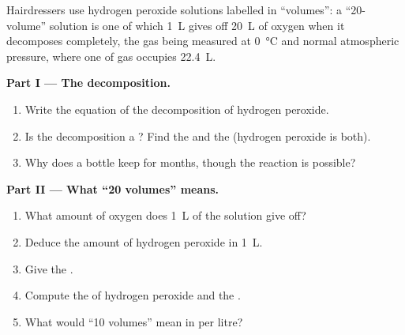 \begin{problem}
\label{pb:g12:catalysis:1}
Hairdressers use hydrogen peroxide solutions labelled in ``volumes'': a
``20-volume'' solution is one of which \qty{1}{L} gives off \qty{20}{L}
of oxygen when it decomposes completely, the gas being measured at
\qty{0}{\celsius} and normal atmospheric pressure, where one  of gas
occupies \qty{22.4}{L}.

\medskip
\noindent\textbf{Part I --- The decomposition.}
\begin{enumerate}
  \item Write the equation of the decomposition of hydrogen peroxide.
  \item Is the decomposition a ? Find the  and the
         (hydrogen peroxide is both).
  \item Why does a bottle keep for months, though the reaction is
        possible?
\end{enumerate}

\medskip
\noindent\textbf{Part II --- What ``20 volumes'' means.}
\begin{enumerate}[resume]
  \item What amount of oxygen does \qty{1}{L} of the solution give off?
  \item Deduce the amount of hydrogen peroxide in \qty{1}{L}.
  \item Give the .
  \item Compute the  of hydrogen peroxide and the .
  \item What would ``10 volumes'' mean in  per litre?
\end{enumerate}


\end{problem}
